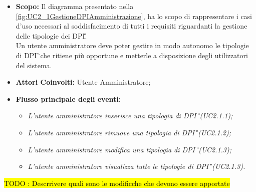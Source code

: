 			\begin{itemize}
				\item \textbf{Scopo:} Il diagramma presentato nella \autoref{fig:UC2_1GestioneDPIAmministrazione}, ha lo scopo di rappresentare i casi d'uso necessari al soddisfacimento di tutti i requisiti riguardanti la gestione delle tipologie dei \gls{DPI}\G.
				 \\ Un utente amministratore deve poter gestire in modo autonomo le tipologie di \gls{DPI}\G\ che ritiene più opportune e metterle a disposizione degli utilizzatori del sistema.
				\item \textbf{Attori Coinvolti:} Utente Amministratore;
				\item \textbf{Flusso principale degli eventi:} 
				\begin{itemize}
					\item \textit{L'utente amministratore inserisce una tipologia di \gls{DPI}\G\ (UC2.1.1);}
					\item \textit{L'utente amministratore rimuove una tipologia di \gls{DPI}\G\ (UC2.1.2);}
					\item \textit{L'utente amministratore modifica una tipologia di \gls{DPI}\G\ (UC2.1.3);}
					\item \textit{L'utente amministratore visualizza tutte le tipologie di \gls{DPI}\G\ (UC2.1.3).}
				\end{itemize}
			\end{itemize}
				\hl{TODO : Descrrivere quali sono le modificche che devono essere apportate}
